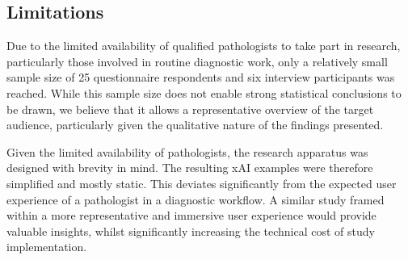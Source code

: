 

    
\subsection{Limitations}

Due to the limited availability of qualified pathologists to take part in research, particularly those involved in routine diagnostic work, only a relatively small sample size of 25 questionnaire respondents and six interview participants was reached. While this sample size does not enable strong statistical conclusions to be drawn, we believe that it allows a representative overview of the target audience, particularly given the qualitative nature of the findings presented.

Given the limited availability of pathologists, the research apparatus was designed with brevity in mind. The resulting xAI examples were therefore simplified and mostly static. This deviates significantly from the expected user experience of a pathologist in a diagnostic workflow. A similar study framed within a more representative and immersive user experience would provide valuable insights, whilst significantly increasing the technical cost of study implementation.

